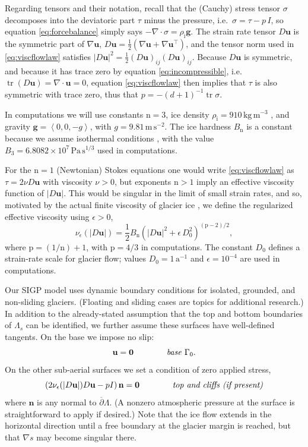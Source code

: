 \documentclass[letterpaper,final,12pt,reqno]{amsart}
\theoremstyle{claim}
\newcommand{\eps}{\epsilon}
\newcommand{\grad}{\nabla}
\newcommand{\Div}{\nabla\cdot}
\newcommand{\trace}{\operatorname{tr}}
\newcommand{\bg}{\mathbf{g}}
\newcommand{\bn}{\mathbf{n}}
\newcommand{\bu}{\mathbf{u}}
\newcommand{\bzero}{\bm{0}}
\newcommand{\rhoi}{\rho_{\text{i}}}
\newcommand{\nn}{{\text{n}}}
\newcommand{\pp}{{\text{p}}}
\numberwithin{equation}{section}
\numberwithin{figure}{section}
\numberwithin{table}{section}
\numberwithin{theorem}{section}
\begin{document}
Regarding tensors and their notation, recall that the (Cauchy) stress tensor $\sigma$ decomposes into the deviatoric part $\tau$ minus the pressure, i.e.~$\sigma = \tau - p\,I$, so equation \eqref{eq:forcebalance} simply says $-\Div \sigma = \rhoi \bg$.  The strain rate tensor $D\bu$ is the symmetric part of $\grad \bu$, $D\bu = \frac{1}{2} \left(\grad\bu + \grad\bu^\top\right)$, and the tensor norm used in \eqref{eq:viscflowlaw} satisfies $|D\bu|^2 = \frac{1}{2} (D\bu)_{ij} (D\bu)_{ij}$.  Because $D\bu$ is symmetric, and because it has trace zero by equation \eqref{eq:incompressible}, i.e.~$\trace(D\bu)=\nabla \cdot \bu = 0$, equation \eqref{eq:viscflowlaw} then implies that $\tau$ is also symmetric with trace zero, thus that $p=-(d+1)^{-1} \trace \sigma$.

In computations we will use constants $\nn=3$, ice density $\rhoi=910 \,\text{kg}\,\text{m}^{-3}$ \cite{Huybrechtsetal1996}, and gravity $\bg=\left<0,0,-g\right>$, with $g=9.81\,\text{m}\,\text{s}^{-2}$.  The ice hardness $B_\nn$ is a constant because we assume isothermal conditions \cite{GreveBlatter2009}, with the value $B_3=6.8082\times 10^7\,\text{Pa}\,\text{s}^{1/3}$ \cite{Huybrechtsetal1996} used in computations.

For the $\nn=1$ (Newtonian) Stokes equations one would write \eqref{eq:viscflowlaw} as $\tau = 2\nu D\bu$ with viscosity $\nu>0$, but exponents $\nn>1$ imply an effective viscosity function of $|D\bu|$.  This would be singular in the limit of small strain rates, and so, motivated by the actual finite viscosity of glacier ice \cite{GreveBlatter2009}, we define the regularized effective viscosity using $\eps>0$,
\begin{equation}
\nu_\eps(|D\bu|) = \frac{1}{2} B_\nn \left(|D\bu|^2 + \eps\, D_0^2\right)^{(\pp-2)/2}, \label{eq:regeffvisc}
\end{equation}
where $\pp=(1/\nn)+1$, with $\pp=4/3$ in computations.  The constant $D_0$ defines a strain-rate scale for glacier flow; values $D_0 = 1 \,\text{a}^{-1}$ and $\eps = 10^{-4}$ are used in computations.

Our SIGP model uses dynamic boundary conditions for isolated, grounded, and non-sliding glaciers.  (Floating and sliding cases are topics for additional research.)  In addition to the already-stated assumption that the top and bottom boundaries of $\Lambda_s$ can be identified, we further assume these surfaces have well-defined tangents.  On the base we impose no slip:
\begin{equation}
\bu = \bzero  \qquad\qquad \text{\emph{base} } \Gamma_0. \label{eq:basebc}
\end{equation}
On the other sub-aerial surfaces we set a condition of zero applied stress,
\begin{equation}
\left(2 \nu_\eps(|D\bu|) D\bu - pI\right) \bn = \bzero  \qquad \qquad \text{\emph{top and cliffs (if present)}} \label{eq:topbc}
\end{equation}
where $\bn$ is any normal to $\overline{\partial} \Lambda$.  (A nonzero atmospheric pressure at the surface is straightforward to apply if desired.)  Note that the ice flow extends in the horizontal direction until a free boundary at the glacier margin is reached, but that $\grad s$ may become singular there.
\end{document}
